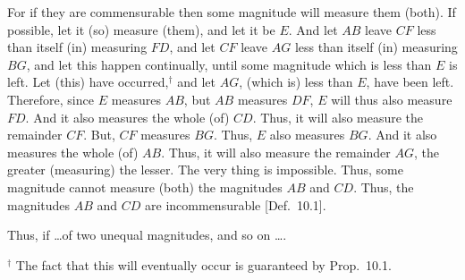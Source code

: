 \begin{Parallel}{}{}
{\epsfysize=0.9in
\centerline{}

For if they are commensurable then some magnitude will measure them (both). If possible, let it
(so) measure (them),  and let it be $E$. And let $AB$ leave $CF$
less than itself (in) measuring $FD$, and let $CF$ leave $AG$ less than
itself (in) measuring $BG$, and let this happen continually, until  some magnitude which is less than  $E$ is left. Let (this) have occurred,$^\dag$ and
let $AG$, (which is) less than $E$, have been left. Therefore, since
$E$ measures $AB$, but $AB$ measures $DF$, $E$ will thus also measure $FD$. And it also measures the whole (of) $CD$. Thus, it will
also measure the remainder  $CF$. But, $CF$ measures $BG$. Thus,
$E$ also measures $BG$. And it also measures the whole (of) $AB$. 
Thus, it will also measure the remainder $AG$, the greater (measuring)
the lesser. The very thing is impossible. Thus, some magnitude cannot
measure (both) the magnitudes $AB$ and $CD$. Thus, the
magnitudes $AB$ and $CD$ are incommensurable [Def.~10.1].

Thus, if \ldots of two unequal magnitudes, and so on \ldots.}
\end{Parallel}
{\footnotesize\noindent$^\dag$ The fact that this will eventually occur is guaranteed by
Prop.~10.1.}

